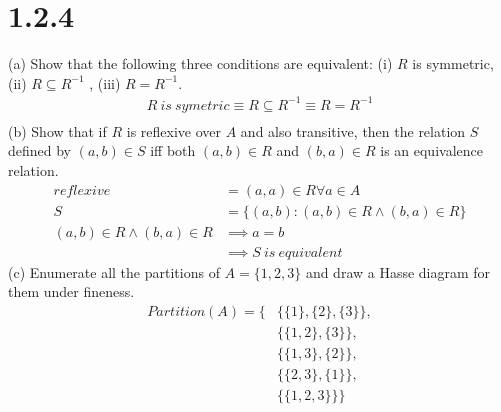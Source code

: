 \documentclass{article}
\begin{document}
\section*{1.2.4}
(a) Show that the following three conditions are equivalent: (i) $R$ is symmetric, (ii) $R \subseteq R^{-1}$ , (iii) $R = R^{-1}$.
\begin{align*}
    R\ is\ symetric \equiv R \subseteq R^{-1} \equiv R = R^{-1}\\
\end{align*}
(b) Show that if $R$ is reflexive over $A$ and also transitive, then the relation $S$ defined by $(a,b) \in S$ iff both $(a,b) \in R$ and $(b,a) \in R$ is an equivalence relation.
\begin{align*}
    reflexive &= (a, a) \in R \forall a \in A \\
    S &= \{(a, b):(a,b) \in R \wedge (b,a) \in R \}\\
    (a,b) \in R \wedge (b,a) \in R &\implies a = b\\
    &\implies S\ is\ equivalent
\end{align*}
(c) Enumerate all the partitions of $A=\{ 1, 2, 3 \}$ and draw a Hasse diagram for them under fineness.
\begin{align*}
    Partition(A) =\{&\{\{1\}, \{2\}, \{3\}\},\\
    &\{\{1, 2\},\{3\}\},\\
    &\{\{1, 3\},\{2\}\},\\
    &\{\{2, 3\},\{1\}\},\\
    &\{\{1, 2, 3\}\}\}
\end{align*}
\begin{center}
\end{center}
\end{document}
